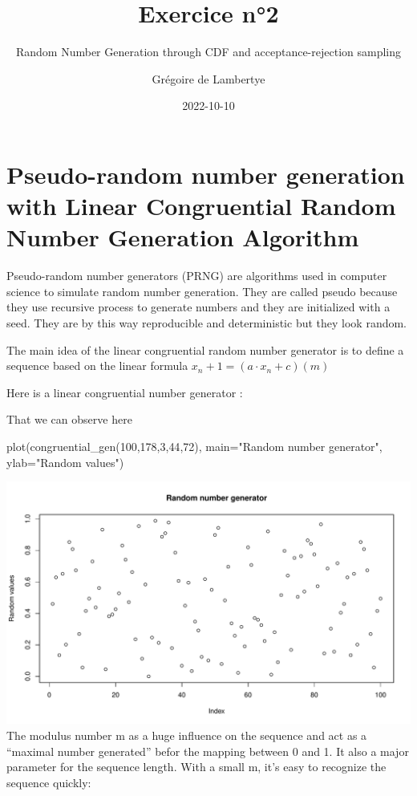 \documentclass[
]{article}
\title{Exercice n°2}
\subtitle{Random Number Generation through CDF and acceptance-rejection
sampling}
\author{Grégoire de Lambertye}
\date{2022-10-10}
\newenvironment{Shaded}{\begin{snugshade}}{\end{snugshade}}
\newcommand{\AttributeTok}[1]{\textcolor[rgb]{0.77,0.63,0.00}{#1}}
\newcommand{\DecValTok}[1]{\textcolor[rgb]{0.00,0.00,0.81}{#1}}
\newcommand{\FunctionTok}[1]{\textcolor[rgb]{0.00,0.00,0.00}{#1}}
\newcommand{\NormalTok}[1]{#1}
\newcommand{\StringTok}[1]{\textcolor[rgb]{0.31,0.60,0.02}{#1}}
\begin{document}
\maketitle

\hypertarget{pseudo-random-number-generation-with-linear-congruential-random-number-generation-algorithm}{%
\section{Pseudo-random number generation with Linear Congruential Random
Number Generation
Algorithm}\label{pseudo-random-number-generation-with-linear-congruential-random-number-generation-algorithm}}

Pseudo-random number generators (PRNG) are algorithms used in computer
science to simulate random number generation. They are called pseudo
because they use recursive process to generate numbers and they are
initialized with a seed. They are by this way reproducible and
deterministic but they look random.

The main idea of the linear congruential random number generator is to
define a sequence based on the linear formula
\({x_n+1} = (a · x_n + c) (m)\)

Here is a linear congruential number generator :

That we can observe here

\begin{Shaded}
\begin{Highlighting}[]
\FunctionTok{plot}\NormalTok{(}\FunctionTok{congruential\_gen}\NormalTok{(}\DecValTok{100}\NormalTok{,}\DecValTok{178}\NormalTok{,}\DecValTok{3}\NormalTok{,}\DecValTok{44}\NormalTok{,}\DecValTok{72}\NormalTok{), }\AttributeTok{main=}\StringTok{"Random number generator"}\NormalTok{, }\AttributeTok{ylab=}\StringTok{"Random values"}\NormalTok{)}
\end{Highlighting}
\end{Shaded}

\includegraphics{Exercicen2_files/figure-latex/unnamed-chunk-2-1.pdf}
The modulus number m as a huge influence on the sequence and act as a
``maximal number generated'' befor the mapping between 0 and 1. It also
a major parameter for the sequence length. With a small m, it's easy to
recognize the sequence quickly:
\end{document}
